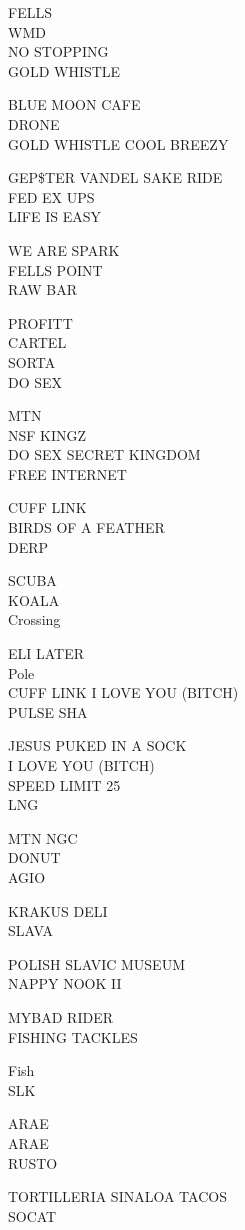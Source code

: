 \documentclass[10pt,letterpaper]{article}
\begin{document}
FELLS\\
WMD\\
NO STOPPING\\
GOLD WHISTLE

BLUE MOON CAFE\\
DRONE\\
GOLD WHISTLE COOL BREEZY

GEP\$TER VANDEL SAKE RIDE\\
FED EX UPS\\
LIFE IS EASY

WE ARE SPARK\\
FELLS POINT\\
RAW BAR

PROFITT\\
CARTEL\\
SORTA\\
DO SEX

MTN\\
NSF KINGZ\\
DO SEX SECRET KINGDOM\\
FREE INTERNET

CUFF LINK\\
BIRDS OF A FEATHER\\
DERP

SCUBA\\
KOALA\\
Crossing

ELI LATER\\
Pole\\
CUFF LINK I LOVE YOU (BITCH)\\
PULSE SHA

JESUS PUKED IN A SOCK\\
I LOVE YOU (BITCH)\\
SPEED LIMIT 25\\
LNG

MTN NGC\\
DONUT\\
AGIO

KRAKUS DELI\\
SLAVA

POLISH SLAVIC MUSEUM\\
NAPPY NOOK II

MYBAD RIDER\\
FISHING TACKLES

Fish\\
SLK

ARAE\\
ARAE\\
RUSTO

TORTILLERIA SINALOA TACOS\\
SOCAT
\end{document}
